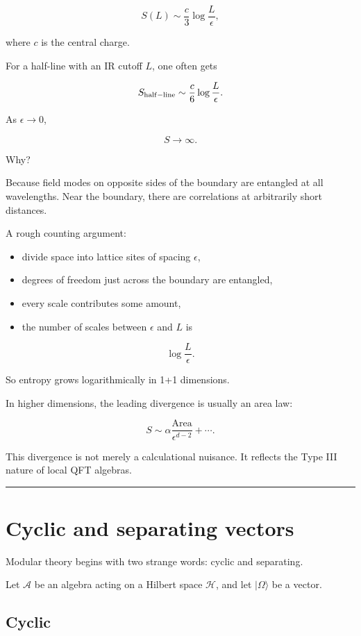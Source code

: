 \documentclass[11pt,a4paper]{article}
\begin{document}
\[
S(L)\sim \frac{c}{3}\log\frac{L}{\epsilon},
\]

where $c$ is the central charge.

For a half-line with an IR cutoff $L$, one often gets

\[
S_{\rm half-line}\sim \frac{c}{6}\log\frac{L}{\epsilon}.
\]

As $\epsilon\to 0$,

\[
S\to \infty.
\]

Why?

Because field modes on opposite sides of the boundary are entangled at all wavelengths. Near the boundary, there are correlations at arbitrarily short distances.

A rough counting argument:

\begin{itemize}
  \item divide space into lattice sites of spacing $\epsilon$,
  \item degrees of freedom just across the boundary are entangled,
  \item every scale contributes some amount,
  \item the number of scales between $\epsilon$ and $L$ is
\end{itemize}

\[
\log\frac{L}{\epsilon}.
\]

So entropy grows logarithmically in 1+1 dimensions.

In higher dimensions, the leading divergence is usually an area law:

\[
S\sim \alpha \frac{\mathrm{Area}}{\epsilon^{d-2}}+\cdots.
\]

This divergence is not merely a calculational nuisance. It reflects the Type III nature of local QFT algebras.

\medskip\hrule\medskip

\section{Cyclic and separating vectors}

Modular theory begins with two strange words: cyclic and separating.

Let $\mathcal{A}$ be an algebra acting on a Hilbert space $\mathcal{H}$, and let $|\Omega\rangle$ be a vector.

\subsection{Cyclic}
\end{document}
